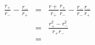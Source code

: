 \begin{eqnarray}\label{eqn:net-likelihood}
\frac{r_+}{r_-} - \frac{r_-}{r_+} & = & \frac{r+}{r_+}\frac{r_+}{r_-} - \frac{r_-}{r_-}\frac{r_-}{r_+} \\
& = & \frac{r_+^2 - r_-^2}{r_+r_-} \\
& = & 
\end{eqnarray}
